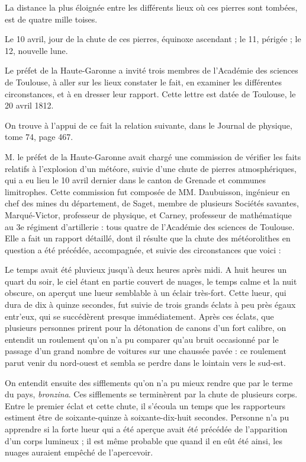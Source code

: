 \documentclass[a4paper, 12pt, oneside, french]{article}
\begin{document}
\og La distance la plus éloignée entre les différents lieux où ces pierres sont tombées, est de quatre mille toises. \fg

\og Le 10 avril, jour de la chute de ces pierres, équinoxe ascendant ; le 11, périgée ; le 12, nouvelle lune. \fg

\og Le préfet de la Haute-Garonne a invité trois membres de l'Académie des sciences de Toulouse, à aller sur les lieux constater le fait, en examiner les différentes circonstances, et à en dresser leur rapport. \fg Cette lettre est datée de Toulouse, le 20 avril 1812.

On trouve à l'appui de ce fait la relation suivante, dans le Journal de physique, tome 74, page 467.

\og M. le préfet de la Haute-Garonne avait chargé une commission de vérifier les faits relatifs à l'explosion d'un météore, suivie d'une chute de pierres atmosphériques, qui a eu lieu le 10 avril dernier dans le canton de Grenade et communes limitrophes. Cette commission fut composée de MM. Daubuisson, ingénieur en chef des mines du département, de Saget, membre de plusieurs Sociétés savantes, Marqué-Victor, professeur de physique, et Carney, professeur de mathématique au 3e régiment d'artillerie : tous quatre de l'Académie des sciences de Toulouse. Elle a fait un rapport détaillé, dont il résulte que la chute des météorolithes en question a été précédée, accompagnée, et suivie des circonstances que voici : \fg

\og Le temps avait été pluvieux jusqu'à deux heures après midi. A huit heures un quart du soir, le ciel étant en partie couvert de nuages, le temps calme et la nuit obscure, on aperçut une lueur semblable à un éclair très-fort. Cette lueur, qui dura de dix à quinze secondes, fut suivie de trois grands éclats à peu près égaux entr'eux, qui se succédèrent presque immédiatement. Après ces éclats, que plusieurs personnes prirent pour la détonation de canons d'un fort calibre, on entendit un roulement qu'on n'a pu comparer qu'au bruit occasionné par le passage d'un grand nombre de voitures sur une chaussée pavée : ce roulement parut venir du nord-ouest et sembla se perdre dans le lointain vers le sud-est. \fg

\og On entendit ensuite des sifflements qu'on n'a pu mieux rendre que par le terme du pays, \emph{bronzina}. Ces sifflements se terminèrent par la chute de plusieurs corps. Entre le premier éclat et cette chute, il s'écoula un temps que les rapporteurs estiment être de soixante-quinze à soixante-dix-huit secondes. Personne n'a pu apprendre si la forte lueur qui a été aperçue avait été précédée de l'apparition d'un corps lumineux ; il est même probable que quand il en eût été ainsi, les nuages auraient empêché de l'apercevoir. \fg
\end{document}
